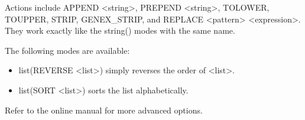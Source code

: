 Actions include APPEND <string>, PREPEND <string>, TOLOWER, TOUPPER, STRIP, GENEX\_STRIP, and REPLACE <pattern> <expression>. They work exactly like the string() modes with the same name.


The following modes are available:

\begin{itemize}
\item
list(REVERSE <list>) simply reverses the order of <list>.

\item
list(SORT <list>) sorts the list alphabetically.
\end{itemize}

Refer to the online manual for more advanced options.











